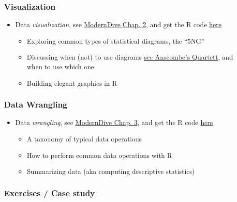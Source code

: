 \documentclass[
  letterpaper,
  DIV=11,
  numbers=noendperiod]{scrreprt}
\providecommand{\tightlist}{%
  \setlength{\itemsep}{0pt}\setlength{\parskip}{0pt}}\usepackage{longtable,booktabs,array}
\theoremstyle{definition}
\theoremstyle{definition}
\theoremstyle{remark}
\begin{document}
\hypertarget{visualization}{%
\subsubsection*{Visualization}\label{visualization}}

\begin{itemize}
\tightlist
\item
  Data \emph{visualization}, see
  \href{https://moderndive.com/2-viz.html}{ModernDive Chap. 2}, and get
  the R code
  \href{http://moderndive.com/scripts/02-visualization.R}{here}

  \begin{itemize}
  \tightlist
  \item
    Exploring common types of statistical diagrams, the ``5NG''
  \item
    Discussing when (not) to use diagrams
    \href{https://public.tableau.com/profile/dan.murray\#!/vizhome/AnscombesQuartet_16/AnscombesQuartet}{see
    Anscombe's Quartett}, and when to use which one
  \item
    Building elegant graphics in R
  \end{itemize}
\end{itemize}

\hypertarget{data-wrangling}{%
\subsubsection*{Data Wrangling}\label{data-wrangling}}

\begin{itemize}
\tightlist
\item
  Data \emph{wrangling}, see
  \href{https://moderndive.com/3-wrangling.html}{ModernDive Chap. 3},
  and get the R code
  \href{http://moderndive.com/scripts/03-wrangling.R}{here}

  \begin{itemize}
  \tightlist
  \item
    A taxonomy of typical data operations
  \item
    How to perform common data operations with R
  \item
    Summarizing data (aka computing descriptive statistics)
  \end{itemize}
\end{itemize}

\hypertarget{exercises-case-study}{%
\subsubsection*{Exercises / Case study}\label{exercises-case-study}}
\end{document}
